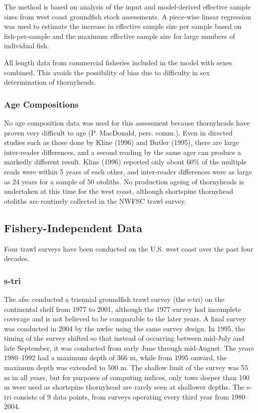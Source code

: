 \documentclass[11pt,
  english,
  letterpaper,
]{article}
\begin{document}
The method is based on analysis of the input and model-derived effective sample sizes from west coast groundfish stock assessments. A piece-wise linear regression was used to estimate the increase in effective sample size per sample based on fish-per-sample and the maximum effective sample size for large numbers of individual fish.

All length data from commercial fisheries included in the model with sexes combined. This avoids the possibility of bias due to difficulty in sex determination of thornyheads.

\hypertarget{age-compositions}{%
\subsubsection{Age Compositions}\label{age-compositions}}

No age composition data was used for this assessment because thornyheads have proven very difficult to age (P. MacDonald, pers. comm.). Even in directed studies such as those done by Kline (1996) and Butler (1995), there are large inter-reader differences, and a second reading by the same ager can produce a markedly different result. Kline (1996) reported only about 60\% of the multiple reads were within 5 years of each other, and inter-reader differences were as large as 24 years for a sample of 50 otoliths. No production ageing of thornyheads is undertaken at this time for the west coast, although shortspine thornyhead otoliths are routinely collected in the NWFSC trawl survey.

\hypertarget{fishery-independent-data}{%
\subsection{Fishery-Independent Data}\label{fishery-independent-data}}

Four trawl surveys have been conducted on the U.S. west coast over the past four decades.

\hypertarget{section}{%
\subsubsection{\texorpdfstring{\acrlong{s-tri}}{}}\label{section}}

The \gls{afsc} conducted a triennial groundfish trawl survey (the \Gls{s-tri}) on the continental shelf from 1977 to 2001, although the 1977 survey had incomplete coverage and is not believed to be comparable to the later years. A final survey was conducted in 2004 by the \gls{nwfsc} using the same survey design. In 1995, the timing of the survey shifted so that instead of occurring between mid-July and late September, it was conducted from early June through mid-August. The years 1980--1992 had a maximum depth of 366 m, while from 1995 onward, the maximum depth was extended to 500 m. The shallow limit of the survey was 55 m in all years, but for purposes of computing indices, only tows deeper than 100 m were used as shortspine thornyhead are rarely seen at shallower depths. The \gls{s-tri} consists of 9 data points, from surveys operating every third year from 1980--2004.
\end{document}
